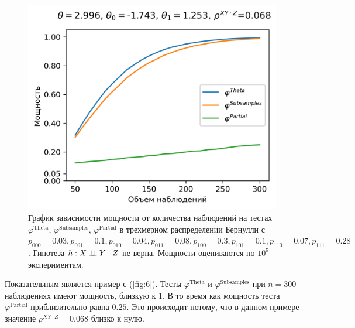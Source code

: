 \begin{figure}[H]
    \centering
    \includegraphics[scale=0.55]{images/graph6.png}
    \caption{График зависимости мощности от количества наблюдений
    на тестах $\varphi^{\text{Theta}}$, $\varphi^{\text{Subsamples}}$, $\varphi^{\text{Partial}}$
    в трехмерном распределении Бернулли с $p_{000}=0.03, p_{001}=0.1, 
    p_{010}=0.04, p_{011}=0.08,
    p_{100}=0.3, p_{101}=0.1, p_{110}=0.07, p_{111}=0.28$. 
    Гипотеза $h: X \perp\!\!\!\perp Y \mid Z$ не верна.
    Мощности оцениваются по $10^5$ экспериментам.} \label{fig:6}
\end{figure}

Показательным является пример с (\autoref{fig:6}). Тесты 
$\varphi^{\text{Theta}}$ и $\varphi^{\text{Subsamples}}$ при $n=300$
наблюдениях имеют мощность, близкую к $1$. В то время как мощность
теста $\varphi^{\text{Partial}}$ приблизительно равна $0.25$. Это происходит потому, что
в данном примере значение $\rho^{XY\cdot Z}=0.068$ близко к нулю.


